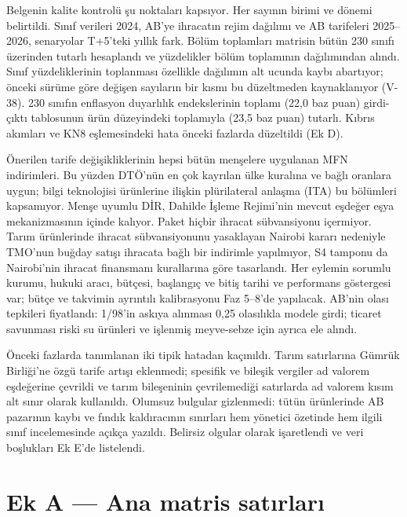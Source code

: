Belgenin kalite kontrolü şu noktaları kapsıyor. Her sayının birimi ve dönemi belirtildi. Sınıf verileri 2024, AB'ye ihracatın rejim dağılımı ve AB tarifeleri 2025--2026, senaryolar T+5'teki yıllık fark. Bölüm toplamları matrisin bütün 230 sınıfı üzerinden tutarlı hesaplandı ve yüzdelikler bölüm toplamının dağılımından alındı. Sınıf yüzdeliklerinin toplanması özellikle dağılımın alt ucunda kaybı abartıyor; önceki sürüme göre değişen sayıların bir kısmı bu düzeltmeden kaynaklanıyor (V-38). 230 sınıfın enflasyon duyarlılık endekslerinin toplamı (22,0 baz puan) girdi-çıktı tablosunun ürün düzeyindeki toplamıyla (23,5 baz puan) tutarlı. Kıbrıs akımları ve KN8 eşlemesindeki hata önceki fazlarda düzeltildi (Ek D).

Önerilen tarife değişikliklerinin hepsi bütün menşelere uygulanan MFN indirimleri. Bu yüzden DTÖ'nün en çok kayrılan ülke kuralına ve bağlı oranlara uygun; bilgi teknolojisi ürünlerine ilişkin plürilateral anlaşma (ITA) bu bölümleri kapsamıyor. Menşe uyumlu DİR, Dahilde İşleme Rejimi'nin mevcut eşdeğer eşya mekanizmasının içinde kalıyor. Paket hiçbir ihracat sübvansiyonu içermiyor. Tarım ürünlerinde ihracat sübvansiyonunu yasaklayan Nairobi kararı nedeniyle TMO'nun buğday satışı ihracata bağlı bir indirimle yapılmıyor, S4 tamponu da Nairobi'nin ihracat finansmanı kurallarına göre tasarlandı. Her eylemin sorumlu kurumu, hukuki aracı, bütçesi, başlangıç ve bitiş tarihi ve performans göstergesi var; bütçe ve takvimin ayrıntılı kalibrasyonu Faz 5--8'de yapılacak. AB'nin olası tepkileri fiyatlandı: 1/98'in askıya alınması 0,25 olasılıkla modele girdi; ticaret savunması riski su ürünleri ve işlenmiş meyve-sebze için ayrıca ele alındı.

Önceki fazlarda tanımlanan iki tipik hatadan kaçınıldı. Tarım satırlarına Gümrük Birliği'ne özgü tarife artışı eklenmedi; spesifik ve bileşik vergiler ad valorem eşdeğerine çevrildi ve tarım bileşeninin çevrilemediği satırlarda ad valorem kısım alt sınır olarak kullanıldı. Olumsuz bulgular gizlenmedi: tütün ürünlerinde AB pazarının kaybı ve fındık kaldıracının sınırları hem yönetici özetinde hem ilgili sınıf incelemesinde açıkça yazıldı. Belirsiz olgular \etiketD{} olarak işaretlendi ve veri boşlukları Ek E'de listelendi.

\hypertarget{nace_kartlar_10-12-ek-a--ana-matris-satux131rlarux131}{%
\section{Ek A --- Ana matris satırları}\label{nace_kartlar_10-12-ek-a--ana-matris-satux131rlarux131}}

